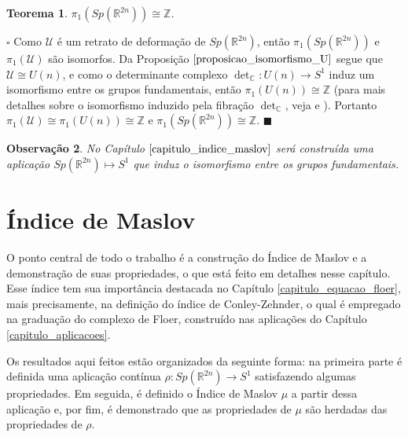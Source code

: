 \documentclass[12pt]{book}
\newtheorem{teorema}{Teorema}[section]
\newtheorem{observacao}[teorema]{Observação}
\newenvironment{prova}[1]{$\square$ #1}{\hfill$\blacksquare$}
\newcommand{\circulo}{S^{1}}
\newcommand{\complexo}[1]{\mathbb{C}^{#1}}
\newcommand{\grupofundamental}[1]{\pi_{1}(#1)}
\newcommand{\gruposimpletico}[1]{Sp(#1)}
\newcommand{\inteiros}{\mathbb{Z}}
\newcommand{\matrizSimpleticaOrtogonal}{\mathcal{U}}
\newcommand{\matrizunitaria}[1]{U(#1)}
\newcommand{\real}[1]{\mathbb{R}^{#1}}
\begin{document}
	
	\begin{teorema}
		$\grupofundamental{\gruposimpletico{\real{2n}}} \cong \inteiros$.
	\end{teorema}
	\begin{prova}
		Como $\matrizSimpleticaOrtogonal$ é um retrato de deformação de $\gruposimpletico{\real{2n}}$, então $\grupofundamental{\gruposimpletico{\real{2n}}}$ e $\grupofundamental{\matrizSimpleticaOrtogonal}$ são isomorfos. Da Proposição $\ref{proposicao_isomorfismo_U}$ segue que $\matrizSimpleticaOrtogonal\cong \matrizunitaria{n}$, e como o determinante complexo $\det_{\complexo{}}: \matrizunitaria{n} \to \circulo$ induz um isomorfismo entre os grupos fundamentais, então $\grupofundamental{\matrizunitaria{n}}\cong \inteiros$ (para mais detalhes sobre o isomorfismo induzido pela fibração $\det_{\complexo{}}$, veja \cite{hatcher} e \cite{mcduff_salamon}). Portanto $\grupofundamental{\matrizSimpleticaOrtogonal} \cong \grupofundamental{\matrizunitaria{n}} \cong \inteiros$ e $\grupofundamental{\gruposimpletico{\real{2n}}} \cong \inteiros$.
	\end{prova}
	
	\begin{observacao}
		No Capítulo $\ref{capitulo_indice_maslov}$ será construída uma aplicação $\gruposimpletico{\real{2n}}\mapsto \circulo$ que induz o isomorfismo entre os grupos fundamentais.
	\end{observacao}
	
	
	\chapter{Índice de Maslov}\label{capitulo_indice_maslov}
	
	O ponto central de todo o trabalho é a construção do Índice de Maslov e a demonstração de suas propriedades, o que está feito em detalhes nesse capítulo. Esse índice tem sua importância destacada no Capítulo \ref{capitulo_equacao_floer}, mais precisamente, na definição do índice de Conley-Zehnder, o qual é empregado na graduação do complexo de Floer, construído nas aplicações do Capítulo \ref{capitulo_aplicacoes}.
	
	Os resultados aqui feitos estão organizados da seguinte forma: na primeira parte é definida uma aplicação contínua $\rho:\gruposimpletico{\real{2n}} \to \circulo$ satisfazendo algumas propriedades. Em seguida, é definido o Índice de Maslov $\mu$ a partir dessa aplicação e, por fim, é demonstrado que as propriedades de $\mu$ são herdadas das propriedades de $\rho$.
	
\end{document}
